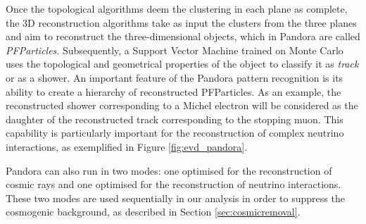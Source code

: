 Once the topological algorithms deem the clustering in each plane as complete, the 3D reconstruction algorithms take as input the clusters from the three planes and aim to reconstruct the three-dimensional objects, which in Pandora are called \emph{PFParticles}.
Subsequently, a Support Vector Machine trained on Monte Carlo uses the topological and geometrical properties of the object to classify it as \emph{track} or as a {shower}. 
An important feature of the Pandora pattern recognition is its ability to create a hierarchy of reconstructed PFParticles. As an example, the reconstructed shower corresponding to a Michel electron will be considered as the daughter of the reconstructed track corresponding to the stopping muon. This capability is particularly important for the reconstruction of complex neutrino interactions, as exemplified in Figure \ref{fig:evd_pandora}.

Pandora can also run in two modes: one optimised for the reconstruction of cosmic rays and one optimised for the reconstruction of neutrino interactions. These two modes are used sequentially in our analysis in order to suppress the cosmogenic background, as described in Section \ref{sec:cosmicremoval}.